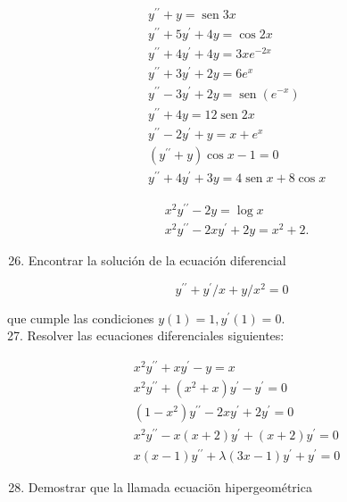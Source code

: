 \documentclass[10pt]{article}
\theoremstyle{plain}
\theoremstyle{definition}
\theoremstyle{remark}
\begin{document}
$$
\begin{aligned}
& y^{\prime \prime}+y=\operatorname{sen} 3 x \\
& y^{\prime \prime}+5 y^{\prime}+4 y=\cos 2 x \\
& y^{\prime \prime}+4 y^{\prime}+4 y=3 x e^{-2 x} \\
& y^{\prime \prime}+3 y^{\prime}+2 y=6 e^{x} \\
& y^{\prime \prime}-3 y^{\prime}+2 y=\operatorname{sen}\left(e^{-x}\right) \\
& y^{\prime \prime}+4 y=12 \operatorname{sen} 2 x \\
& y^{\prime \prime}-2 y^{\prime}+y=x+e^{x} \\
& \left(y^{\prime \prime}+y\right) \cos x-1=0 \\
& y^{\prime \prime}+4 y^{\prime}+3 y=4 \operatorname{sen} x+8 \cos x
\end{aligned}
$$


$$
\begin{aligned}
& x^{2} y^{\prime \prime}-2 y=\log x \\
& x^{2} y^{\prime \prime}-2 x y^{\prime}+2 y=x^{2}+2 .
\end{aligned}
$$

\begin{enumerate}
  \setcounter{enumi}{25}
  \item Encontrar la solución de la ecuación diferencial
\end{enumerate}

$$
y^{\prime \prime}+y^{\prime} / x+y / x^{2}=0
$$

que cumple las condiciones $y(1)=1, y^{\prime}(1)=0$.\\
27. Resolver las ecuaciones diferenciales siguientes:

$$
\begin{aligned}
& x^{2} y^{\prime \prime}+x y^{\prime}-y=x \\
& x^{2} y^{\prime \prime}+\left(x^{2}+x\right) y^{\prime}-y^{\prime}=0 \\
& \left(1-x^{2}\right) y^{\prime \prime}-2 x y^{\prime}+2 y^{\prime}=0 \\
& x^{2} y^{\prime \prime}-x(x+2) y^{\prime}+(x+2) y^{\prime}=0 \\
& x(x-1) y^{\prime \prime}+\lambda(3 x-1) y^{\prime}+y^{\prime}=0
\end{aligned}
$$

\begin{enumerate}
  \setcounter{enumi}{27}
  \item Demostrar que la llamada ecuaciön hipergeométrica
\end{enumerate}
\end{document}
